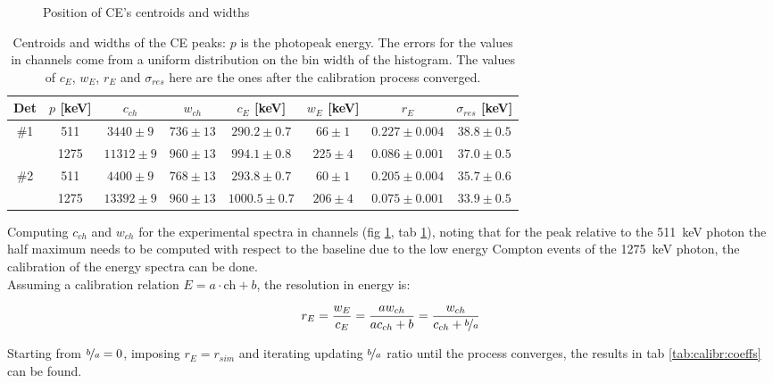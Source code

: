 \documentclass[11pt,a4 paper]{article}
\let\oldfrac\frac
\renewcommand{\frac}[3][d]{\ifthenelse{\equal{#1}{d}}{\oldfrac{#2}{#3}}{\nicefrac{#2}{#3}}}
\begin{document}
\begin{figure}[H]
    \centering
    \caption{Position of CE's centroids and widths}
    \label{fig:det12:calibr}
\end{figure}

\begin{table}[H]
  \centering
  \begin{tabular}{cccccccc}
    \toprule
    Det & $p$ [keV] & $c_{ch}$ & $w_{ch}$ & $c_E$ [keV] & $w_E$ [keV] & $r_E$ & $\sigma_{res}$ [keV]\\
    \midrule
    \#1 & 511 & $3440 \pm 9$ & $736 \pm 13$ & $290.2 \pm 0.7$ & $66 \pm 1$ & $0.227 \pm 0.004$ & $38.8 \pm 0.5$ \\
        & 1275 & $11312 \pm 9$ & $960 \pm 13$ & $994.1 \pm 0.8$ & $225 \pm 4$ & $0.086 \pm 0.001$ & $37.0 \pm 0.5$ \\
    \#2 & 511 & $4400 \pm 9$ & $768 \pm 13$ & $293.8 \pm 0.7$ & $60 \pm 1$ & $0.205 \pm 0.004$ & $35.7 \pm 0.6$ \\
        & 1275 & $13392 \pm 9$ & $960 \pm 13$ & $1000.5 \pm 0.7$ & $206 \pm 4$ & $0.075 \pm 0.001$ & $33.9 \pm 0.5$ \\
    \bottomrule
  \end{tabular}
  \caption{Centroids and widths of the CE peaks: $p$ is the photopeak energy. The errors for the values in channels come from a uniform distribution on the bin width of the histogram. The values of $c_E$, $w_E$, $r_E$ and $\sigma_{res}$ here are the ones after the calibration process converged.}
  \label{tab:calibr:fits}
\end{table}

Computing $c_{ch}$ and $w_{ch}$ for the experimental spectra in channels (fig \ref{fig:det12:calibr}, tab \ref{tab:calibr:fits}), noting that for the peak relative to the \SI{511}{\kilo\electronvolt} photon the half maximum needs to be computed with respect to the baseline due to the low energy Compton events of the \SI{1275}{\kilo\electronvolt} photon, the calibration of the energy spectra can be done.\\
Assuming a calibration relation $E = a \cdot \text{ch} + b$, the resolution in energy is:

\begin{equation*}
  r_E = \frac{w_E}{c_E} = \frac{a w_{ch}}{a c_{ch} + b} = \frac{w_{ch}}{c_{ch} + \frac[f]{b}{a}}
\end{equation*}

Starting from $\frac[f]{b}{a} = 0$, imposing $r_E = r_{sim}$ and iterating updating $\frac[f]{b}{a}$ ratio until the process converges, the results in tab \ref{tab:calibr:coeffs} can be found.
\end{document}
